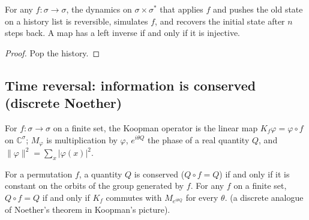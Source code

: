 \begin{theorem}
  \label{thm:history-dynamics}
  \leanok
  For any $f : \sigma \to \sigma$, the dynamics on $\sigma \times \sigma^*$ that applies $f$ and pushes
  the old state on a history list is reversible, simulates $f$, and recovers the initial state after
  $n$ steps back. A map has a left inverse if and only if it is injective.
\end{theorem}

\begin{proof}
  \leanok
  Pop the history.
\end{proof}

\subsection{Time reversal: information is conserved (discrete Noether)}

\begin{definition}
  \label{def:koopman}
  \leanok
  For $f : \sigma \to \sigma$ on a finite set, the Koopman operator is the linear map
  $K_f \varphi = \varphi \circ f$ on $\mathbb{C}^\sigma$; $M_\varphi$ is multiplication by $\varphi$,
  $e^{i\theta Q}$ the phase of a real quantity $Q$, and $\|\varphi\|^2 = \sum_x |\varphi(x)|^2$.
\end{definition}

\begin{theorem}
  \label{thm:noether}
  \leanok
  For a permutation $f$, a quantity $Q$ is conserved ($Q \circ f = Q$) if and only if it is constant
  on the orbits of the group generated by $f$. For any $f$ on a finite set, $Q \circ f = Q$ if and
  only if $K_f$ commutes with $M_{e^{i\theta Q}}$ for every $\theta$.
  \own{} (a discrete analogue of Noether's theorem in Koopman's picture).
\end{theorem}

